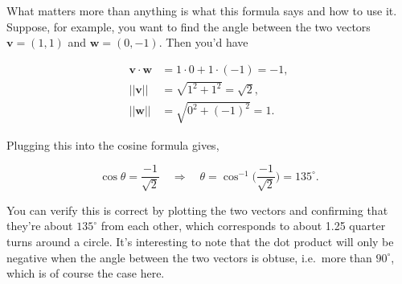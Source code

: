 \documentclass[
  letterpaper,
  DIV=11,
  numbers=noendperiod]{scrreprt}
\newenvironment{Shaded}{\begin{snugshade}}{\end{snugshade}}
\newcommand{\CharTok}[1]{\textcolor[rgb]{0.13,0.47,0.30}{#1}}
\newcommand{\DecValTok}[1]{\textcolor[rgb]{0.68,0.00,0.00}{#1}}
\newcommand{\FloatTok}[1]{\textcolor[rgb]{0.68,0.00,0.00}{#1}}
\newcommand{\NormalTok}[1]{\textcolor[rgb]{0.00,0.23,0.31}{#1}}
\newcommand{\OperatorTok}[1]{\textcolor[rgb]{0.37,0.37,0.37}{#1}}
\newcommand{\SpecialCharTok}[1]{\textcolor[rgb]{0.37,0.37,0.37}{#1}}
\newcommand{\StringTok}[1]{\textcolor[rgb]{0.13,0.47,0.30}{#1}}
\begin{document}
What matters more than anything is what this formula says and how to use
it. Suppose, for example, you want to find the angle between the two
vectors \(\mathbf{v} = (1,1)\) and \(\mathbf{w} = (0, -1)\). Then you'd
have

\begin{align*}
\mathbf{v} \cdot \mathbf{w} &= 1 \cdot 0 + 1 \cdot (-1) = -1, \\
||\mathbf{v}|| &= \sqrt{1^2 + 1^2} = \sqrt{2}, \\
||\mathbf{w}|| &= \sqrt{0^2 + (-1)^2} = 1.
\end{align*}

Plugging this into the cosine formula gives,

\[
\cos \theta = \frac{-1}{\sqrt{2}} \quad \Longrightarrow \quad \theta = \cos^{-1}\bigg(\frac{-1}{\sqrt{2}}\bigg) = 135^\circ.
\]

You can verify this is correct by plotting the two vectors and
confirming that they're about \(135^\circ\) from each other, which
corresponds to about 1.25 quarter turns around a circle. It's
interesting to note that the dot product will only be negative when the
angle between the two vectors is obtuse, i.e.~more than \(90^\circ\),
which is of course the case here.

\begin{Shaded}
\end{Shaded}
\end{document}
